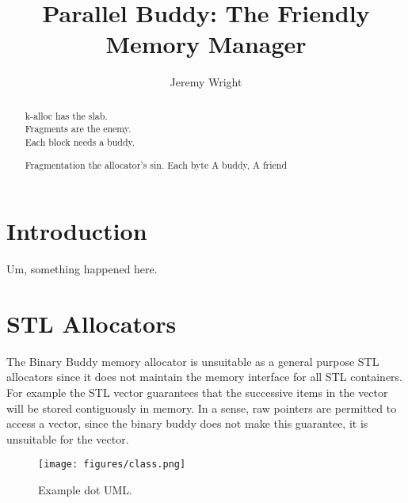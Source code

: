 \documentclass[10pt]{article}
\title{Parallel Buddy: The Friendly Memory Manager}
\author{Jeremy Wright}
\begin{document}
\maketitle

\begin{abstract}
k-alloc has the slab.\\
Fragments are the enemy.\\
Each block needs a buddy.


Fragmentation the
allocator's sin. Each byte
A buddy, A friend
 

\end{abstract}

\section{Introduction}
Um, something happened here.


\section{STL Allocators}
The Binary Buddy memory allocator is unsuitable as a general purpose STL
allocators since it does not maintain the memory interface for all STL
containers. For example the STL vector guarantees that the successive items in
the vector will be stored contiguously in memory. In a sense, raw pointers are
permitted to access a vector, since the binary buddy does not make this
guarantee, it is unsuitable for the vector.


\begin{figure*}[h]
\texttt{[image: figures/class.png]}
\caption{Example dot UML.}
\label{fig:example_uml}
\end{figure*}
\end{document}
